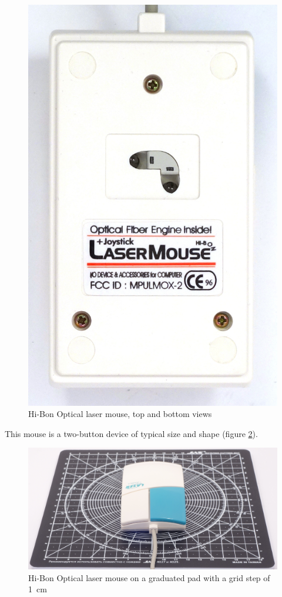 \documentclass[11pt, a4paper]{article}
\begin{document}
\begin{figure}[h]
    \includegraphics[scale=0.4]{1996_hi-bon_laser_mouse/bottom_60.jpg}
    \caption{Hi-Bon Optical laser mouse, top and bottom views}
    \label{fig:OpticalLaserMouseTopBottom}
\end{figure}

This mouse is a two-button device of typical size and shape (figure \ref{fig:OpticalLaserMouseSize}).

\begin{figure}[h]
    \centering
    \includegraphics[scale=0.3]{1996_hi-bon_laser_mouse/size.jpg}
    \caption{Hi-Bon Optical laser mouse on a graduated pad with a grid step of 1~cm}
    \label{fig:OpticalLaserMouseSize}
\end{figure}
\end{document}
